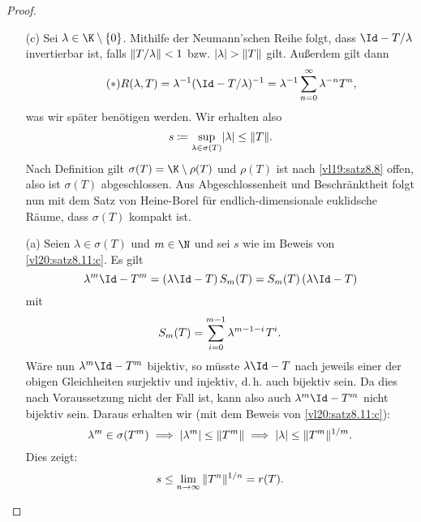 \begin{proof}
    \begin{enumerate}[(a)]
        \item[(c)]
            Sei $\lambda\in\K\setminus\{0\}$. Mithilfe der Neumann'schen Reihe
             folgt, dass
            $\Id-T/\lambda$ invertierbar ist, falls $\norm{T/\lambda} < 1$
            bzw. $\abs\lambda > \norm{T}$ gilt. Außerdem gilt dann
            \[ \tag{$\ast$} \label{vl20:ast}
                R(\lambda,T) = \lambda^{-1} (\Id - T/\lambda )^{-1}
                = \lambda^{-1} \nsum[0]^\infty \lambda^{-n} T^n
            , \]
            was wir später benötigen werden. Wir erhalten also
            \[ s \defeq \sup_{\lambda\in\sigma(T)} \abs\lambda \leq \norm{T}
            . \]
            Nach Definition gilt $\sigma(T) = \K\setminus\rho(T)$ und $\rho(T)$
            ist nach \cref{vl19:satz8.8} offen, also ist $\sigma(T)$ abgeschlossen.
            Aus Abgeschlossenheit und Beschränktheit
            folgt nun mit dem Satz von Heine-Borel für endlich-dimensionale
            euklidsche Räume, dass $\sigma(T)$ kompakt ist.
            
        \item[(a)]
            Seien $\lambda\in\sigma(T)$ und $m\in\N$ und sei $s$ wie im Beweis
            von \ref{vl20:satz8.11:c}. Es gilt
            \[ \lambda^m\Id - T^m = (\lambda\Id-T) \, S_m(T)
                = S_m(T) \, (\lambda\Id-T)
            \]
            mit
            \[ S_m(T) = \isum[0]^{m-1} \lambda^{m-1-i} \mkern2mu T^i  . \]
            Wäre nun $\lambda^m\Id-T^m$ bijektiv, so müsste $\lambda\Id-T$ nach
            jeweils einer der obigen Gleichheiten surjektiv und injektiv, d.\,h.
            auch bijektiv sein. Da dies nach Voraussetzung nicht der Fall ist,
            kann also auch $\lambda^m\Id-T^m$ nicht bijektiv sein.
            Daraus erhalten wir (mit dem Beweis von \ref{vl20:satz8.11:c}):
            \[ \lambda^m \in \sigma(T^m)
                \implies \abs{\lambda^m} \leq \norm{T^m}
                \implies \abs\lambda \leq \norm{T^m}^{1/m}
            . \]
            Dies zeigt:
            \[ s \leq \lim_{n\to\infty} \, \norm{T^n}^{1/n} = r(T) . \]
            

\end{enumerate}
\end{proof}
